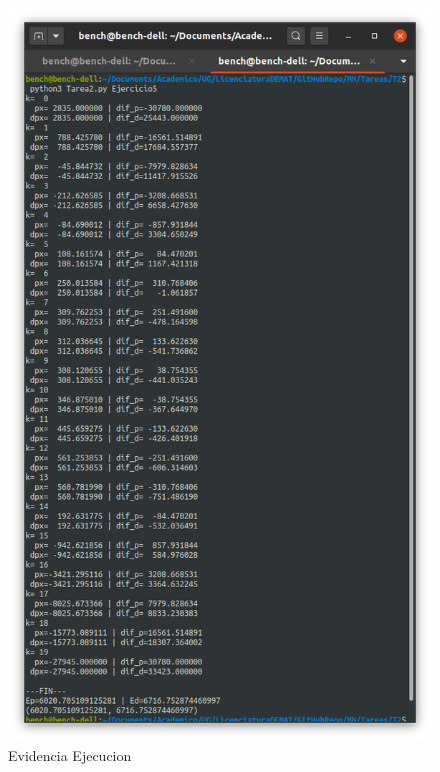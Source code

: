 \documentclass[11pt]{article}
\begin{document}
\begin{figure}
\centering
\includegraphics{assets/E5-1.png}
\caption{Evidencia Ejecucion}
\end{figure}


    
    
    
\end{document}
